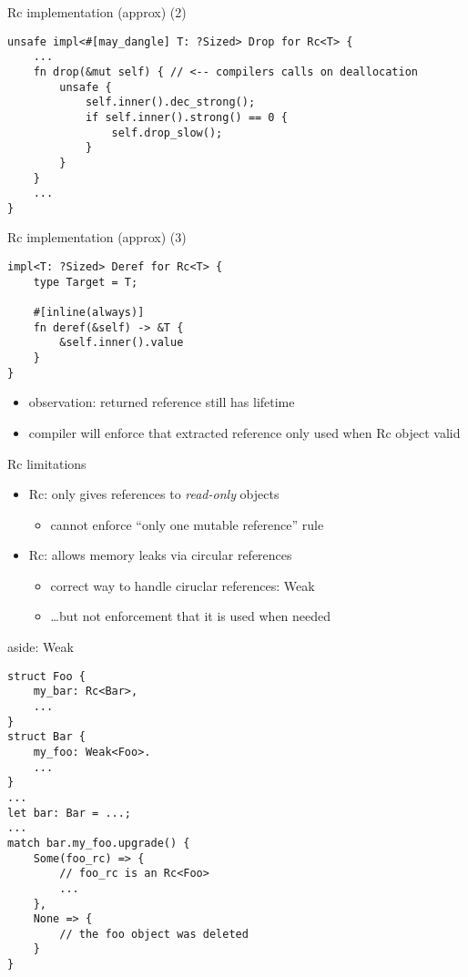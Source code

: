 \begin{frame}[fragile,label=rcImplB]{Rc implementation (approx) (2)}
\begin{verbatim}
unsafe impl<#[may_dangle] T: ?Sized> Drop for Rc<T> {
    ...
    fn drop(&mut self) { // <-- compilers calls on deallocation
        unsafe {
            self.inner().dec_strong();
            if self.inner().strong() == 0 {
                self.drop_slow();
            }
        }
    }
    ...
}
\end{verbatim}
\end{frame}

\begin{frame}[fragile,label=rcImplC]{Rc implementation (approx) (3)}
\begin{verbatim}
impl<T: ?Sized> Deref for Rc<T> {
    type Target = T;

    #[inline(always)]
    fn deref(&self) -> &T {
        &self.inner().value
    }
}
\end{verbatim}
\begin{itemize}
\item observation: returned reference still has lifetime
\item compiler will enforce that extracted reference only used when Rc object valid
\end{itemize}
\end{frame}


\begin{frame}{Rc limitations}
    \begin{itemize}
    \item Rc: only gives references to \textit{read-only} objects
        \begin{itemize}
        \item cannot enforce ``only one mutable reference'' rule
        \end{itemize}
    \item Rc: allows memory leaks via circular references
        \begin{itemize}
        \item correct way to handle ciruclar references: Weak
        \item \ldots but not enforcement that it is used when needed
        \end{itemize}
    \end{itemize}
\end{frame}

\begin{frame}[fragile]{aside: Weak}
\begin{verbatim}
struct Foo {
    my_bar: Rc<Bar>,
    ...
}
struct Bar {
    my_foo: Weak<Foo>.
    ...
}
...
let bar: Bar = ...;
...
match bar.my_foo.upgrade() {
    Some(foo_rc) => {
        // foo_rc is an Rc<Foo>
        ...
    },
    None => {
        // the foo object was deleted
    }
}
\end{verbatim}
\end{frame}

